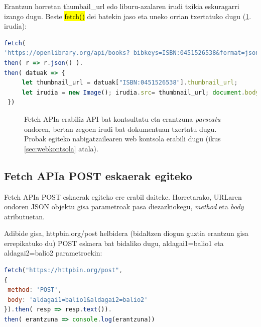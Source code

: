 Erantzun horretan thumbail\_url edo liburu-azalaren irudi txikia eskuragarri izango dugu. Beste \hl{fetch()} dei batekin jaso eta uneko orrian txertatuko dugu (\ref{fig:fetchAPIwebkontsola}. irudia):

\begin{lstlisting}[language=JavaScript]
fetch(
'https://openlibrary.org/api/books? bibkeys=ISBN:0451526538&format=json').
then( r => r.json() ).
then( datuak => { 
     let thumbnail_url = datuak["ISBN:0451526538"].thumbnail_url;
     let irudia = new Image(); irudia.src= thumbnail_url; document.body.appendChild( irudia );
 })
\end{lstlisting}

\begin{figure}[ht]
	\centering
{}
\caption{Fetch APIa erabiliz API bat kontsultatu eta erantzuna \textit{parseatu} ondoren, bertan zegoen irudi bat dokumentuan txertatu dugu. Probak egiteko nabigatzailearen web kontsola erabili dugu (ikus \ref{sec:webkontsola} atala).}
\label{fig:fetchAPIwebkontsola}
\end{figure}

\subsection{Fetch APIa POST eskaerak egiteko}

Fetch APIa POST eskaerak egiteko ere erabil daiteke. Horretarako, URLaren ondoren JSON objektu gisa parametroak pasa diezazkiokegu, \textit{method} eta \textit{body} atributuetan. 

Adibide gisa, httpbin.org/post helbidera (bidaltzen diogun guztia erantzun gisa errepikatuko du) POST eskaera bat bidaliko dugu, aldagai1=balio1 eta aldagai2=balio2 parametroekin:

\begin{minipage}{\linewidth}
\begin{lstlisting}[language=JavaScript]
fetch("https://httpbin.org/post", 
{ 
 method: 'POST',
 body: 'aldagai1=balio1&aldagai2=balio2'
}).then( resp => resp.text()).
then( erantzuna => console.log(erantzuna))
\end{lstlisting}
\end{minipage}

